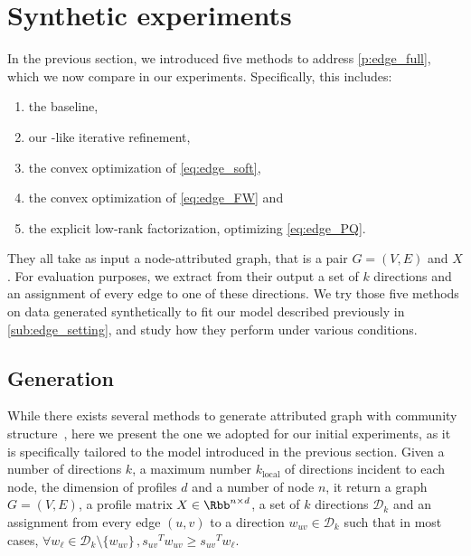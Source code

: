 \section{Synthetic experiments}
\label{sec:edge_exp}

In the previous section, we introduced five methods to address \autoref{p:edge_full}, which we now
compare in our experiments. Specifically, this includes:
\begin{enumerate}[1.,nosep]
\item the \kmeans{} baseline,
\item our \lloyd{}-like iterative refinement,
\item the \combined{} convex optimization of \eqref{eq:edge_soft},
\item the \fwa{} convex optimization of \eqref{eq:edge_FW} and
\item the \pqt{} explicit low-rank factorization, optimizing \eqref{eq:edge_PQ}.
\end{enumerate}
They all take as input a node-attributed graph, that is a pair $G=(V, E)$ and $X$.
For evaluation purposes, we extract from their output a set of $k$ directions and an
assignment of every edge to one of these directions.
We try those five methods on data generated synthetically to fit our model described previously in
\autoref{sub:edge_setting}, and study how they perform under various conditions.


\subsection{Generation}
\label{sub:edge_generation}

While there exists several methods to generate attributed graph with community
structure~\autocites{Yang2013}{XuBayesian14}{Kataoka2016}, here we present the one we adopted for
our initial experiments, as it is specifically tailored to the model introduced in the previous
section. Given a number of directions $k$, a maximum number $k_\mathrm{local}$ of directions
incident to each node, the dimension of profiles $d$ and a number of node $n$, it return a graph
$G=(V,E)$, a profile matrix $X\in \Rbb^{n\times d}$, a set of $k$ directions $\mathcal{D}_k$ and an
assignment from every edge $(u,v)$ to a direction $w_{uv} \in \mathcal{D}_k$ such that in most
cases, $\forall w_\ell \in \mathcal{D}_k \setminus \{w_{uv}\}\,, {s_{uv}}^T w_{uv} \geq  {s_{uv}}^T
w_\ell$.

